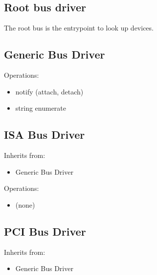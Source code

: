 \subsection{Root bus driver}

The root bus is the entrypoint to look up devices.

\subsection{Generic Bus Driver}

Operations:
\begin{itemize}
\item notify (attach, detach)
\item string enumerate
\end{itemize}


\subsection{ISA Bus Driver}

Inherits from:
\begin{itemize}
\item Generic Bus Driver
\end{itemize}

Operations:
\begin{itemize}
\item (none)
\end{itemize}


\subsection{PCI Bus Driver}

Inherits from:
\begin{itemize}
\item Generic Bus Driver
\end{itemize}

